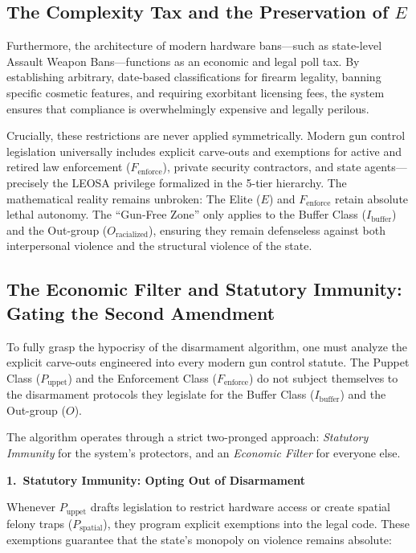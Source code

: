 \documentclass[12pt,openany]{book}
\begin{document}
\subsection{The Complexity Tax and the Preservation of \texorpdfstring{$E$}{E}}
Furthermore, the architecture of modern hardware bans---such as state-level Assault Weapon Bans---functions as an economic and legal poll tax. By establishing arbitrary, date-based classifications for firearm legality, banning specific cosmetic features, and requiring exorbitant licensing fees, the system ensures that compliance is overwhelmingly expensive and legally perilous.

Crucially, these restrictions are never applied symmetrically. Modern gun control legislation universally includes explicit carve-outs and exemptions for active and retired law enforcement ($F_{\text{enforce}}$), private security contractors, and state agents---precisely the LEOSA privilege formalized in the 5-tier hierarchy. The mathematical reality remains unbroken: The Elite ($E$) and $F_{\text{enforce}}$ retain absolute lethal autonomy. The ``Gun-Free Zone'' only applies to the Buffer Class ($I_{\text{buffer}}$) and the Out-group ($O_{\text{racialized}}$), ensuring they remain defenseless against both interpersonal violence and the structural violence of the state.

\subsection{The Economic Filter and Statutory Immunity: Gating the Second Amendment}

To fully grasp the hypocrisy of the disarmament algorithm, one must analyze the explicit carve-outs engineered into every modern gun control statute. The Puppet Class ($P_{\text{uppet}}$) and the Enforcement Class ($F_{\text{enforce}}$) do not subject themselves to the disarmament protocols they legislate for the Buffer Class ($I_{\text{buffer}}$) and the Out-group ($O$).

The algorithm operates through a strict two-pronged approach: \textit{Statutory Immunity} for the system's protectors, and an \textit{Economic Filter} for everyone else.

\medskip
\noindent\textbf{1.\ Statutory Immunity: Opting Out of Disarmament}

\noindent Whenever $P_{\text{uppet}}$ drafts legislation to restrict hardware access or create spatial felony traps ($P_{\text{spatial}}$), they program explicit exemptions into the legal code. These exemptions guarantee that the state's monopoly on violence remains absolute:
\end{document}

